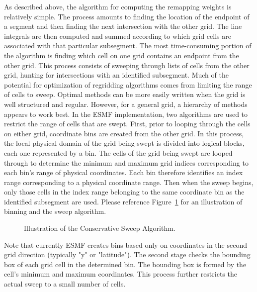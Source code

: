      As described above, the algorithm for computing the remapping weights
     is relatively simple.  The process amounts to finding the location of
     the endpoint of a segment and then finding the next intersection with
     the other grid.  The line integrals are then computed and summed according
     to which grid cells are associated with that particular subsegment.  The
     most time-consuming portion of the algorithm is finding which cell on one
     grid contains an endpoint from the other grid.  This process consists
     of sweeping through lists of cells from the other grid, hunting for
     intersections with an identified subsegment.   Much of the potential for
     optimization of regridding algorithms comes from limiting the range of
     cells to sweep.  Optimal methods can be more easily written when the grid
     is well structured and regular.  However, for a general grid, a hierarchy
     of methods appears to work best.  In the ESMF
     implementation, two algorithms are used to restrict the range of cells
     that are swept.  First, prior to looping through the cells on either grid,
     coordinate bins are created from the other grid.  In this process, the local
     physical domain of the grid being swept is divided into logical blocks, each
     one represented by a bin.  The cells of the grid being swept are looped through
     to determine the minimum and maximum grid indices corresponding to each bin's
     range of physical coordinates.  Each bin therefore identifies an index range
     corresponding to a physical coordinate range.  Then when the sweep begins,
     only those cells in the index range belonging to the same coordinate bin as
     the identified subsegment are used.  Please reference
     Figure~\ref{fig:ConservSweep} for an illustration of binning and the sweep
     algorithm.

\begin{center}
\begin{figure}
\caption{Illustration of the Conservative Sweep Algorithm. }
\label{fig:ConservSweep}
\end{figure}
\end{center}

     Note that currently ESMF creates bins based
     only on coordinates in the second grid direction (typically "y" or "latitude").
     The second stage checks the bounding box of each grid cell in the determined
     bin.  The bounding box is formed by the cell's minimum and maximum coordinates.
     This process further restricts the actual sweep to a small number of cells.

